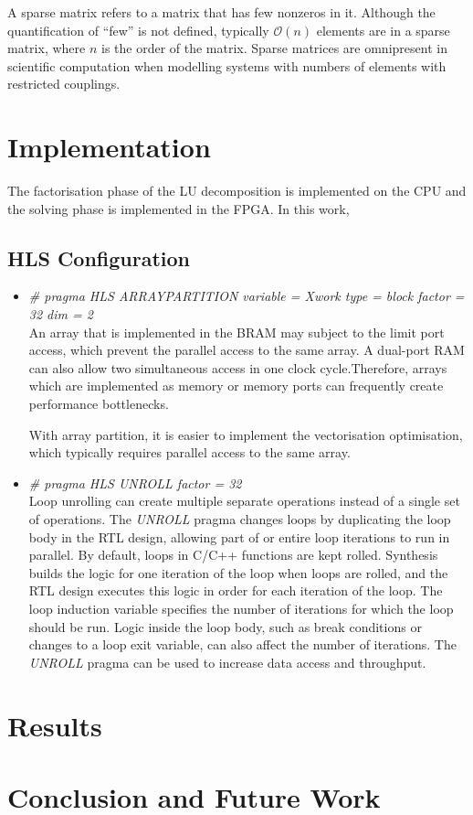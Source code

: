 \documentclass[11pt,a4paper]{article}
\begin{document}
A sparse matrix refers to a matrix that has few nonzeros in it. Although the quantification of ``few'' is not defined, typically \(\mathcal{O}(n)\) elements are in a sparse matrix, where \(n\) is the order of the matrix. Sparse matrices are omnipresent in scientific computation when modelling systems with numbers of elements with restricted couplings.

\section{Implementation}
The factorisation phase of the LU decomposition is implemented on the CPU and the solving phase is implemented in the FPGA. In this work,

\subsection{HLS Configuration}
\begin{itemize}
    \item \textit{\# pragma HLS ARRAY\textunderscore PARTITION variable = Xwork type = block factor = 32 dim = 2}\\
    An array that is implemented in the BRAM may subject to the limit port access, which prevent the parallel access to the same array. A dual-port RAM can also allow two simultaneous access in one clock cycle.Therefore, arrays which are implemented as memory or memory ports can frequently create performance bottlenecks.

    With array partition, it is easier to implement the vectorisation optimisation, which typically requires parallel access to the same array.

    \item \textit{\# pragma HLS UNROLL factor = 32}\\
    Loop unrolling can create multiple separate operations instead of a single set of operations. The \emph{UNROLL} pragma changes loops by duplicating the loop body in the RTL design, allowing part of or entire loop iterations to run in parallel. By default, loops in C/C++ functions are kept rolled.  Synthesis builds the logic for one iteration of the loop when loops are rolled, and the RTL design executes this logic in order for each iteration of the loop. The loop induction variable specifies the number of iterations for which the loop should be run. Logic inside the loop body, such as break conditions or changes to a loop exit variable, can also affect the number of iterations. The \emph{UNROLL} pragma can be used to increase data access and throughput.
\end{itemize}

\section{Results}


\section{Conclusion and Future Work}

\renewcommand*{\bibname}{References}

\begin{sloppypar}
  \relax
  \printbibliography[heading=bibintoc,title={References}]
\end{sloppypar}
\end{document}

